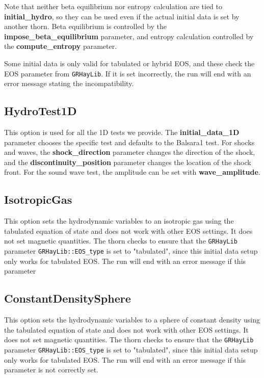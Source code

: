 \documentclass{article}
\newcommand{\glib}{\texttt{GRHayLib}\xspace}
\begin{document}
Note that neither beta equilibrium nor entropy calculation are
tied to \textbf{initial\_hydro}, so they can be used even if
the actual initial data is set by another thorn. Beta equilibrium
is controlled by the \textbf{impose\_beta\_equilibrium} parameter,
and entropy calculation controlled by the \textbf{compute\_entropy}
parameter.

Some initial data is only valid for tabulated or hybrid EOS, and
these check the EOS parameter from \glib. If it is set incorrectly,
the run will end with an error message stating the incompatibility.

\subsection{HydroTest1D}

This option is used for all the 1D tests we provide. The
\textbf{initial\_data\_1D} parameter chooses the
specific test and defaults to the Balsara1 test. For shocks and
waves, the \textbf{shock\_direction} parameter changes the
direction of the shock, and the \textbf{discontinuity\_position}
parameter changes the location of the shock front. For the sound
wave test, the amplitude can be set with \textbf{wave\_amplitude}.

\subsection{IsotropicGas}

This option sets the hydrodynamic variables to an isotropic gas using
the tabulated equation of state and does not work with other EOS
settings. It does not set magnetic quantities. The thorn checks to
ensure that the \glib parameter \texttt{GRHayLib::EOS\_type} is set to
"tabulated", since this initial data setup only works for tabulated EOS.
The run will end with an error message if this parameter

\subsection{ConstantDensitySphere}

This option sets the hydrodynamic variables to a sphere of constant
density using the tabulated equation of state and does not work
with other EOS settings. It does not set magnetic quantities. The thorn
checks to ensure that the \glib parameter \texttt{GRHayLib::EOS\_type}
is set to "tabulated", since this initial data setup only works for
tabulated EOS. The run will end with an error message if this parameter
is not correctly set.
\end{document}
